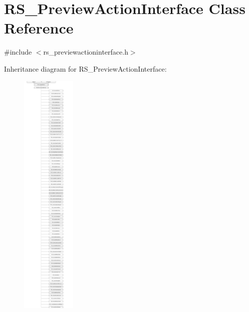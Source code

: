 \hypertarget{classRS__PreviewActionInterface}{\section{R\-S\-\_\-\-Preview\-Action\-Interface Class Reference}
\label{classRS__PreviewActionInterface}
}


{\ttfamily \#include $<$rs\-\_\-previewactioninterface.\-h$>$}

Inheritance diagram for R\-S\-\_\-\-Preview\-Action\-Interface\-:\begin{figure}[H]
\begin{center}
\leavevmode
\includegraphics[height=12.000000cm]{classRS__PreviewActionInterface}
\end{center}
\end{figure}
